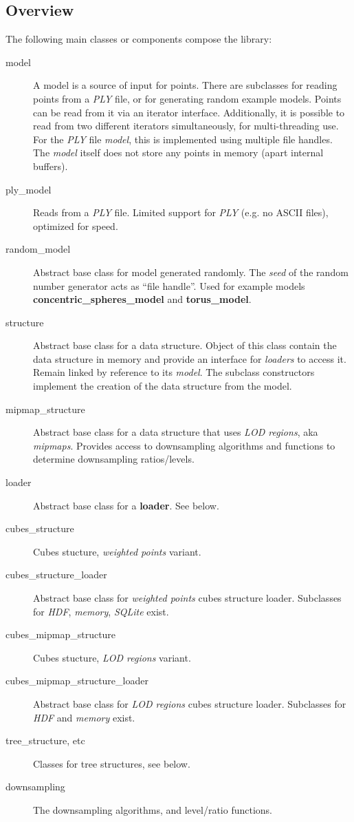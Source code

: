 \documentclass[a4paper,10pt,abstracton,notitlepage]{scrreprt}
\begin{document}
\subsection{Overview}
The following main classes or components compose the library:
\begin{description}
\item[model] A model is a source of input for points. There are subclasses for reading points from a \emph{PLY} file, or for generating random example models. Points can be read from it via an iterator interface. Additionally, it is possible to read from two different iterators simultaneously, for multi-threading use. For the \emph{PLY} file \emph{model}, this is implemented using multiple file handles. The \emph{model} itself does not store any points in memory (apart internal buffers).
\item[ply\_model] Reads from a \emph{PLY} file. Limited support for \emph{PLY} (e.g. no ASCII files), optimized for speed.
\item[random\_model] Abstract base class for model generated randomly. The \emph{seed} of the random number generator acts as ``file handle''. Used for example models \textbf{concentric\_spheres\_model} and \textbf{torus\_model}.
\item[structure] Abstract base class for a data structure. Object of this class contain the data structure in memory and provide an interface for \emph{loaders} to access it. Remain linked by reference to its \emph{model}. The subclass constructors implement the creation of the data structure from the model.
\item[mipmap\_structure] Abstract base class for a data structure that uses \emph{LOD regions}, aka \emph{mipmaps}. Provides access to downsampling algorithms and functions to determine downsampling ratios/levels.
\item[loader] Abstract base class for a \textbf{loader}. See below.
\item[cubes\_structure] Cubes stucture, \emph{weighted points} variant.
\item[cubes\_structure\_loader] Abstract base class for \emph{weighted points} cubes structure loader. Subclasses for \emph{HDF}, \emph{memory}, \emph{SQLite} exist.
\item[cubes\_mipmap\_structure] Cubes stucture, \emph{LOD regions} variant.
\item[cubes\_mipmap\_structure\_loader] Abstract base class for \emph{LOD regions} cubes structure loader. Subclasses for \emph{HDF} and \emph{memory} exist.
\item[tree\_structure, etc] Classes for tree structures, see below.
\item[downsampling] The downsampling algorithms, and level/ratio functions.
\end{description}
\end{document}
